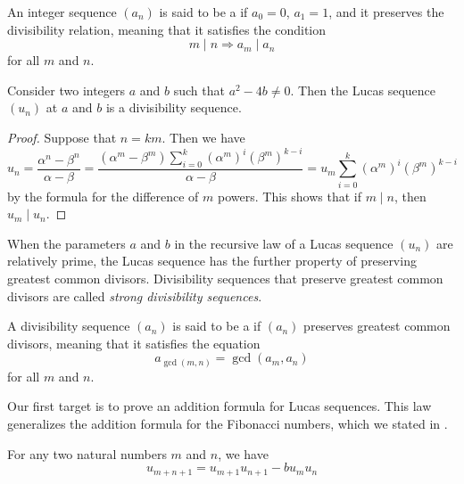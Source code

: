 \begin{definition}
  An integer sequence $(a_n)$ is said to be a  if $a_0=0$, $a_1=1$, and it preserves the divisibility relation, meaning that it satisfies the condition
  \begin{equation*}
    m\mid n \Rightarrow a_m\mid a_n
  \end{equation*}
  for all $m$ and $n$.
\end{definition}

\begin{theorem}
  Consider two integers $a$ and $b$ such that $a^2-4b\neq 0$. Then the Lucas sequence $(u_n)$ at $a$ and $b$ is a divisibility sequence.
\end{theorem}

\begin{proof}
  Suppose that $n=km$. Then we have
  \begin{equation*}
    u_n=\frac{\alpha^n-\beta^n}{\alpha-\beta}=\frac{(\alpha^m-\beta^m)\sum_{i=0}^k (\alpha^m)^i(\beta^m)^{k-i}}{\alpha-\beta}=u_m\sum_{i=0}^k (\alpha^m)^i(\beta^m)^{k-i}
  \end{equation*}
  by the formula for the difference of $m$\supth{} powers. This shows that if $m\mid n$, then $u_m\mid u_n$.
\end{proof}

When the parameters $a$ and $b$ in the recursive law of a Lucas sequence $(u_n)$ are relatively prime, the Lucas sequence has the further property of preserving greatest common divisors. Divisibility sequences that preserve greatest common divisors are called \emph{strong divisibility sequences}.

\begin{definition}
  A divisibility sequence $(a_n)$ is said to be a  if $(a_n)$ preserves greatest common divisors, meaning that it satisfies the equation
  \begin{equation*}
    a_{\gcd(m,n)}=\gcd(a_m,a_n)
  \end{equation*}
  for all $m$ and $n$.
\end{definition}

Our first target is to prove an addition formula for Lucas sequences. This law generalizes the addition formula for the Fibonacci numbers, which we stated in .

\begin{proposition}\label{proposition:addition-formula-lucas-sequence}
  For any two natural numbers $m$ and $n$, we have
  \begin{equation*}
    u_{m+n+1}=u_{m+1} u_{n+1}-b u_{m}u_n
  \end{equation*}
\end{proposition}

